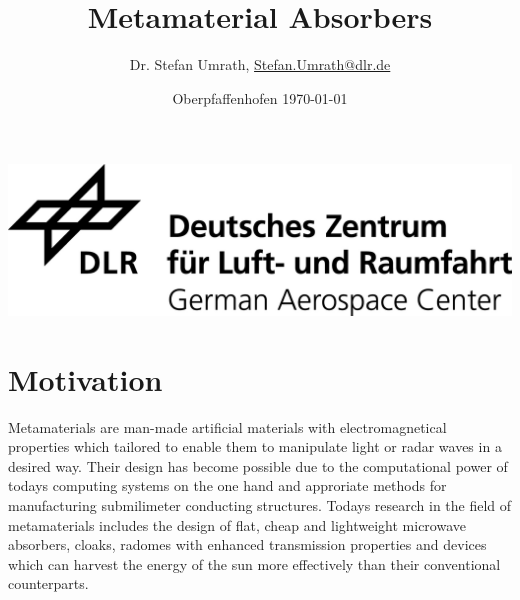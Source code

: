 \documentclass[a4paper,12pt]{scrartcl}  %
\title{Metamaterial Absorbers}
\author[1]{Dr. Stefan Umrath, \href{mailto:Stefan.Umrath@dlr.de}{Stefan.Umrath@dlr.de}}
\affil[1]{German Aerospace Center (DLR)}
\date{Oberpfaffenhofen \today{} \vspace{3cm}}
\begin{document}
\maketitle
\begin{center}
\includegraphics[width= 0.75\linewidth]{../media/DLR_Logo_engl_schwarz.jpg}
\end{center}

\newpage
\tableofcontents 
\newpage
\section{Motivation}

Metamaterials are man-made artificial materials with electromagnetical properties which
tailored to enable them to manipulate light or radar waves in a desired way.
Their design has become possible due to the computational power of todays computing systems on the one hand
and approriate methods for manufacturing submilimeter conducting structures. Todays research in the field of
metamaterials includes the design of flat, cheap and lightweight microwave absorbers, cloaks, radomes 
with enhanced transmission properties and devices which can harvest the energy of the sun more 
effectively than their conventional counterparts.
\end{document}
